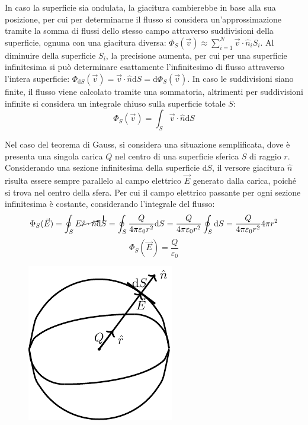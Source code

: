 \documentclass{article}
\newcommand{\df}{\mathrm{d}}
\numberwithin{equation}{subsection}
\begin{document}
In caso la superficie sia ondulata, la giacitura cambierebbe in base alla sua posizione, per cui per determinarne il flusso si considera un'approssimazione tramite la somma 
di flussi dello stesso campo attraverso suddivisioni della superficie, ognuna con una giacitura diversa: 
$\Phi_S(\vec{v})\approx\sum_{i=1}^N\vec{v}\cdot\hat{n}_iS_i$. Al diminuire della superficie $S_i$, la precisione aumenta, per cui per una superficie infinitesima si può 
determinare esattamente l'infinitesimo di flusso attraverso l'intera superficie: $\Phi_{\df S}(\vec{v})=\vec{v}\cdot\hat{n}\df S=\df\Phi_{S}(\vec{v})$. In caso le suddivisioni 
siano finite, il flusso viene calcolato tramite una sommatoria, altrimenti per suddivisioni infinite si considera un integrale chiuso sulla superficie totale $S$:
\begin{equation}
    \displaystyle\Phi_S(\vec{v})=\int_{S}\vec{v}\cdot\hat{n}\df S
\end{equation}




Nel caso del teorema di Gauss, si considera una situazione semplificata, dove è presenta una singola carica $Q$ nel centro di una superficie sferica $S$ di raggio $r$. 
Considerando una sezione infinitesima della superficie $\df S$, il versore giacitura $\hat{n}$ risulta essere sempre parallelo al campo elettrico $\vec{E}$ generato dalla carica, 
poiché si trova nel centro della sfera. Per cui il campo elettrico passante per ogni sezione infinitesima è costante, considerando l'integrale del flusso: 
\begin{gather*}
    \Phi_S(\vec{E})=\displaystyle\oint_{S}E\cancelto{1}{\hat{r}\cdot\hat{n}}\df S=\oint_S\frac{Q}{4\pi\varepsilon_0r^2}\df S=\frac{Q}{4\pi\varepsilon_0r^2}\oint_S\df S=\frac{Q}{4\pi\varepsilon_0r^2}4\pi r^2
\end{gather*} 
\begin{equation}
    \Phi_S(\vec{E})=\frac{Q}{\varepsilon_0}
\end{equation}
\begin{figure}[H]%
    \centering
    \includegraphics{teorema-gauss.pdf}%
    \label{fig:teorema-gauss}
\end{figure}
\end{document}
